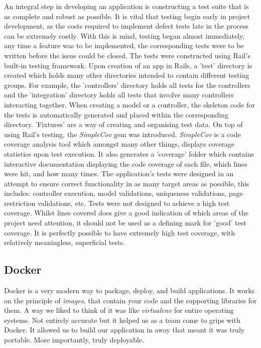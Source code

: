 \documentclass{l3proj}
\begin{document}
An integral step in developing an application is constructing a test suite that is as complete and robust as possible. It is vital that testing begin early in project development, as the costs required to implement defect tests late in the process can be extremely costly. With this is mind, testing began almost immediately, any time a feature was to be implemented, the corresponding tests were to be written before the issue could be closed. The tests were constructed using Rail's built-in testing framework. Upon creation of an app in Rails, a 'test' directory is created which holds many other directories intended to contain different testing groups. For example, the 'controllers' directory holds all tests for the controllers and the 'integration' directory holds all tests that involve many controllers interacting together. When creating a model or a controller, the skeleton code for the tests is automatically generated and placed within the corresponding directory. 'Fixtures' are a way of creating and organising test data. On top of using Rail's testing, the \textit{SimpleCov} gem was introduced. \textit{SimpleCov} is a code coverage analysis tool which amongst many other things, displays coverage statistics upon test execution. It also generates a 'coverage' folder which contains interactive documentation displaying the code coverage of each file, which lines were hit, and how many times. The application's tests were designed in an attempt to ensure correct functionality in as many target areas as possible, this includes: controller execution, model validations, uniqueness validations, page restriction validations, etc. Tests were not designed to achieve a high test coverage. Whilst lines covered does give a good indication of which areas of the project need attention, it should not be used as a defining mark for 'good' test coverage. It is perfectly possible to have extremely high test coverage, with relatively meaningless, superficial tests.


\subsection{Docker}
\label{sec:docker}

Docker is a very modern way to package, deploy, and build applications. It works on the principle of \textit{images}, that contain your code and the supporting libraries for them. A way we liked to think of it was like \textit{virtualenv} for entire operating systems. Not entirely accurate but it helped us as a team come to grips with Docker. It allowed us to build our application in away that meant it was truly portable. More importantly, truly deployable.
\end{document}
